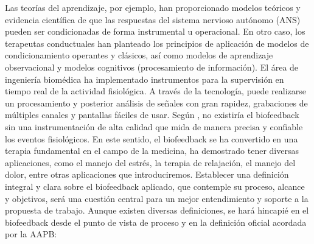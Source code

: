 Las teorías del aprendizaje, por ejemplo, han proporcionado modelos teóricos y evidencia científica de que las respuestas del sistema nervioso autónomo (ANS) pueden ser condicionadas de forma instrumental u operacional. En otro caso, los terapeutas conductuales han planteado los principios de aplicación de modelos de condicionamiento operantes y clásicos, así como modelos de aprendizaje observacional y modelos cognitivos (procesamiento de información). El área de ingeniería biomédica ha implementado instrumentos para la supervisión en tiempo real de la actividad fisiológica. A través de la tecnología, puede realizarse un procesamiento y posterior análisis de señales con gran rapidez, grabaciones de múltiples canales y pantallas fáciles de usar. Según \cite{Schwarts2nd}, no existiría el biofeedback sin una instrumentación de alta calidad que mida de manera precisa y confiable los eventos fisiológicos. En este sentido, el biofeedback se ha convertido en una terapia fundamental en el campo de la medicina, ha demostrado tener diversas aplicaciones, como el manejo del estrés, la terapia de relajación, el manejo del dolor, entre otras aplicaciones que introduciremos. 
Establecer una definición integral y clara sobre el biofeedback aplicado, que contemple su proceso, alcance y objetivos, será una cuestión central para un mejor entendimiento y soporte a la propuesta de trabajo. Aunque existen diversas definiciones, se hará hincapié en el biofeedback desde el punto de vista de proceso y en la definición oficial acordada por la \gls{AAPB}:

\newpage

\noindent{}
\newline\newline

